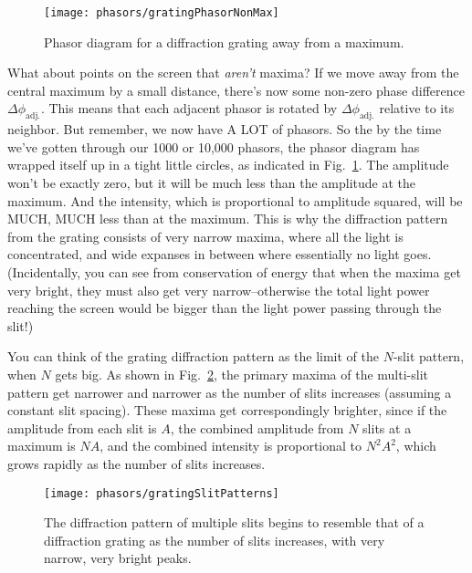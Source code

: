 \begin{figure}[b]
\begin{center}\texttt{[image: phasors/gratingPhasorNonMax]}
\end{center}
\caption{\label{gratingNonMaxFig}Phasor diagram for a diffraction grating
away from a maximum.}
\end{figure}

What about points on the screen that \emph{aren't} maxima?  If we move
away from  the central maximum by  a small distance,  there's now some
non-zero  phase difference  $\Delta\phi_\text{adj.}$. This  means that
each adjacent  phasor is rotated  by $\Delta\phi_\text{adj.}$ relative
to its neighbor. But remember, we now have A LOT of phasors. So the by
the time we've  gotten through our 1000 or  10,000 phasors, the phasor
diagram  has  wrapped itself  up  in  a tight little  circles,  as
indicated in  Fig.~\ref{gratingNonMaxFig}. The  amplitude won't be  exactly zero,  but it
will  be  much  less  than  the  amplitude at  the  maximum.  And  the
intensity, which  is proportional to amplitude squared,  will be MUCH,
MUCH less  than at the maximum.   This is why  the diffraction pattern
from the grating  consists of very narrow maxima,  where all the light
is  concentrated, and wide  expanses in  between where  essentially no
light goes.   (Incidentally, you can  see from conservation  of energy
that  when  the  maxima get  very  bright,  they  must also  get  very
narrow--otherwise the  total light power reaching the  screen would be
bigger than the light power passing through the slit!)

You can think  of the grating diffraction pattern as  the limit of the
$N$-slit    pattern,    when   $N$    gets    big.    As   shown    in
Fig.~\ref{gratingSlitPatterns}, the  primary maxima of  the multi-slit
pattern get  narrower and  narrower as the  number of  slits increases
(assuming a constant slit  spacing).  These maxima get correspondingly
brighter, since if  the amplitude from each slit  is $A$, the combined
amplitude  from $N$  slits at  a maximum  is $N  A$, and  the combined
intensity is  proportional to  $N^2 A^2$, which  grows rapidly  as the
number of slits increases.


\begin{figure}
\begin{center}\texttt{[image: phasors/gratingSlitPatterns]}
\end{center}
\caption{\label{gratingSlitPatterns} The diffraction pattern of multiple
slits begins to resemble that of a diffraction grating as the number of 
slits increases, with very narrow, very bright peaks.}
\end{figure}


